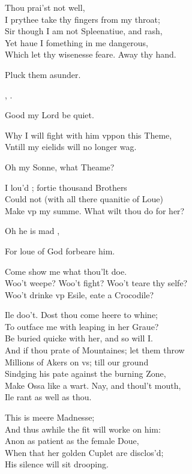 \documentclass[a5paper,DIV=calc,11pt]{scrbook}
\begin{document}
\begin{drama*}
    \hamspeaks Thou prai'st not well,\\
    I prythee take thy fingers from my throat;\\
    Sir though I am not Spleenatiue, and rash,\\
    Yet haue I fomething in me dangerous,\\
    Which let thy wisenesse feare. Away thy hand.
    
    \kingspeaks Pluck them asunder.
    
    \queenspeaks \ham, \ham.
    
     Good my Lord be quiet.
    
    \hamspeaks Why I will fight with him vppon this Theme,\\
    Vntill my eielids will no longer wag.
    
    \queenspeaks Oh my Sonne, what Theame?
    
    \hamspeaks I lou'd \ophe; fortie thousand Brothers\\
    Could not (with all there quanitie of Loue)\\
    Make vp my summe. What wilt thou do for her?
    
    \kingspeaks Oh he is mad \laer,
    
    \queenspeaks For loue of God forbeare him.
    
    \hamspeaks Come show me what thou'lt doe.\\
    Woo't weepe? Woo't fight? Woo't teare thy selfe?\\
    Woo't drinke vp Esile, eate a Crocodile?
    
    Ile doo't. Dost thou come heere to whine;\\
    To outface me with leaping in her Graue?\\
    Be buried quicke with her, and so will I.\\
    And if thou prate of Mountaines; let them throw\\
    Millions of Akers on vs; till our ground\\
    Sindging his pate against the burning Zone,\\
    Make Ossa like a wart. Nay, and thoul't mouth,\\
    Ile rant as well as thou.
    
    \kingspeaks This is meere Madnesse;\\
    And thus awhile the fit will worke on him:\\
    Anon as patient as the female Doue,\\
    When that her golden Cuplet are disclos'd;\\
    His silence will sit drooping.
    

\end{drama*}
\end{document}
